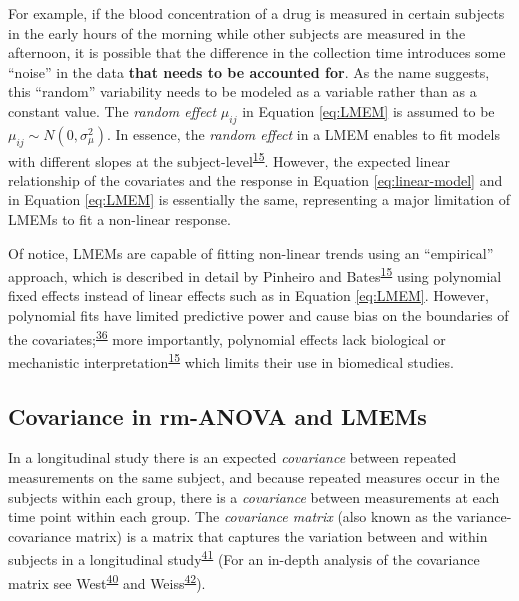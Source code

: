 \documentclass[
]{article}
\begin{document}
For example, if the blood concentration of a drug is measured in certain subjects in the early hours of the morning while other subjects are measured in the afternoon, it is possible that the difference in the collection time introduces some ``noise'' in the data \textbf{that needs to be accounted for}. As the name suggests, this ``random'' variability needs to be modeled as a variable rather than as a constant value. The \emph{random effect} \(\mu_{ij}\) in Equation \eqref{eq:LMEM} is assumed to be \(\mu_{ij} \sim N(0,\sigma^2_\mu)\). In essence, the \emph{random effect} in a LMEM enables to fit models with different slopes at the subject-level\textsuperscript{\protect\hyperlink{ref-pinheiro2006}{15}}. However, the expected linear relationship of the covariates and the response in Equation \eqref{eq:linear-model} and in Equation \eqref{eq:LMEM} is essentially the same, representing a major limitation of LMEMs to fit a non-linear response.

Of notice, LMEMs are capable of fitting non-linear trends using an ``empirical'' approach, which is described in detail by Pinheiro and Bates\textsuperscript{\protect\hyperlink{ref-pinheiro2006}{15}} using polynomial fixed effects instead of linear effects such as in Equation \eqref{eq:LMEM}. However, polynomial fits have limited predictive power and cause bias on the boundaries of the covariates;\textsuperscript{\protect\hyperlink{ref-beck1998}{36}} more importantly, polynomial effects lack biological or mechanistic interpretation\textsuperscript{\protect\hyperlink{ref-pinheiro2006}{15}} which limits their use in biomedical studies.

\hypertarget{covariance-in-rm-anova-and-lmems}{%
\subsection{Covariance in rm-ANOVA and LMEMs}\label{covariance-in-rm-anova-and-lmems}}

In a longitudinal study there is an expected \emph{covariance} between repeated measurements on the same subject, and because repeated measures occur in the subjects within each group, there is a \emph{covariance} between measurements at each time point within each group. The \emph{covariance matrix} (also known as the variance-covariance matrix) is a matrix that captures the variation between and within subjects in a longitudinal study\textsuperscript{\protect\hyperlink{ref-wolfinger1996}{41}} (For an in-depth analysis of the covariance matrix see West\textsuperscript{\protect\hyperlink{ref-west2014}{40}} and Weiss\textsuperscript{\protect\hyperlink{ref-weiss2005}{42}}).
\end{document}
